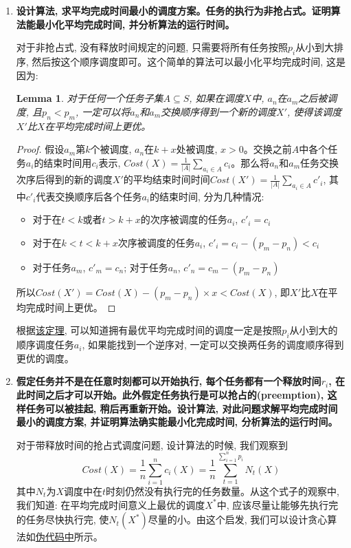 \documentclass[paper=a4, fontsize=11pt]{scrartcl} %
\numberwithin{equation}{section} %
\numberwithin{figure}{section} %
\numberwithin{table}{section} %
\newtheorem{lemma}[theorem]{Lemma}
\begin{document}
\begin{enumerate}[a]
\item \textbf{设计算法, 求平均完成时间最小的调度方案。任务的执行为非抢占式。证明算法能最小化平均完成时间, 并分析算法的运行时间。}
  
对于非抢占式, 没有释放时间规定的问题, 只需要将所有任务按照$p_i$从小到大排序, 然后按这个顺序调度即可。这个简单的算法可以最小化平均完成时间, 这是因为:

\begin{lemma}
  \label{lemma:1}
  对于任何一个任务子集$A \subseteq S$, 如果在调度$X$中, $a_n$在$a_m$之后被调度, 且$p_n < p_m$, 一定可以将$a_n$和$a_m$交换顺序得到一个新的调度$X'$, 使得该调度$X'$比$X$在平均完成时间上更优。
\end{lemma}
\begin{proof}
  假设$a_m$第$k$个被调度, $a_n$在$k + x$处被调度, $x > 0$。交换之前$A$中各个任务$a_i$的结束时间用$c_i$表示, $Cost(X) = \frac{1}{|A|}\sum_{a_i \in A} c_i$。那么将$a_n$和$a_m$任务交换次序后得到的新的调度$X'$的平均结束时间时间$Cost(X') = \frac{1}{|A|}\sum_{a_i \in A} c'_i$, 其中$c'_i$代表交换顺序后各个任务$a_i$的结束时间, 分为几种情况:
  \begin{itemize}
  \item 对于在$t < k$或者$t > k + x$的次序被调度的任务$a_i$, $c'_i = c_i$
  \item 对于在$k < t < k + x$次序被调度的任务$a_i$, $c'_i = c_i - (p_m - p_n) < c_i$
  \item 对于任务$a_m$, $c'_m = c_n$; 对于任务$a_n$, $c'_n = c_m - (p_m - p_n)$
  \end{itemize}
  所以$Cost(X') = Cost(X) - (p_m - p_n) \times x < Cost(X)$, 即$X'$比$X$在平均完成时间上更优。
\end{proof}

根据\hyperref[lemma:1]{该定理}, 可以知道拥有最优平均完成时间的调度一定是按照$p_i$从小到大的顺序调度任务$a_i$, 如果能找到一个逆序对, 一定可以交换两任务的调度顺序得到更优的调度。

\item \textbf{假定任务并不是在任意时刻都可以开始执行, 每个任务都有一个释放时间$r_i$, 在此时间之后才可以开始。此外假定任务执行是可以抢占的(preemption), 这样任务可以被挂起, 稍后再重新开始。设计算法, 对此问题求解平均完成时间最小的调度方案, 并证明算法确实能最小化完成时间, 分析算法的运行时间。}

  对于带释放时间的抢占式调度问题, 设计算法的时候, 我们观察到
  \[
  Cost(X) = \frac{1}{n} \sum_{i=1}^n c_i(X) = \frac{1}{n}\displaystyle\sum_{t=1}^{\sum_{i=1}^n p_i} {N_t(X)}
  \]
  其中$N_t$为$X$调度中在$t$时刻仍然没有执行完的任务数量。从这个式子的观察中, 我们知道: 在平均完成时间意义上最优的调度$X^{*}$中, 应该尽量让能够先执行完的任务尽快执行完, 使$N_t(X^{*})$尽量的小。由这个启发, 我们可以设计贪心算法如\hyperref[algo:1]{伪代码中}所示。


\end{enumerate}
\end{document}
